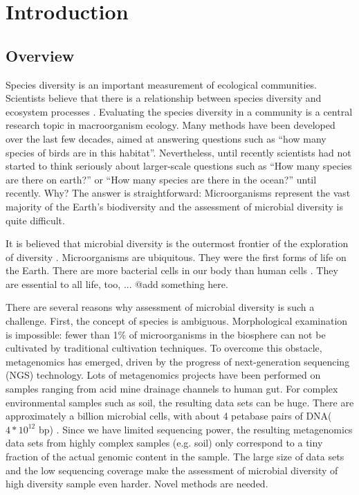 \chapter{Introduction}

\section{Overview} Species diversity is an important measurement of ecological
communities. Scientists believe that there is a relationship between species
diversity and ecosystem processes \cite{Loreau:2001aa}. Evaluating the species
diversity in a community is a central research topic in macroorganism ecology.
Many methods have been developed over the last few decades, aimed at answering
questions such as ``how many species of birds are in this habitat''.
Nevertheless, until recently scientists had not started to think seriously
about larger-scale questions such as ``How many species are there on earth?''
\cite{May:1988aa} or ``How many species are there in the ocean?''
\cite{Mora:2011aa} until recently. Why? The answer is straightforward:
Microorganisms represent the vast majority of the Earth's biodiversity and the
assessment of microbial diversity is quite difficult.

It is believed that microbial diversity is the outermost frontier of the
exploration of diversity \cite{magurran2011biological}. Microorganisms are
ubiquitous. They were the first forms of life on the Earth. There are more
bacterial cells in our body than human cells \cite{Savage:1977aa}. They are
essential to all life, too, ... @add something here.

There are several reasons why assessment of microbial diversity is such a
challenge. First, the concept of species is ambiguous. Morphological
examination is impossible: fewer than 1\% of microorganisms  in the biosphere
can not be cultivated by traditional cultivation
techniques\cite{Curtis:2002aa}. To overcome this obstacle, metagenomics has
emerged, driven by the progress of next-generation sequencing (NGS) technology.
Lots of metagenomics projects have been performed on samples ranging from acid
mine drainage channels to human gut. For complex environmental samples such as
soil, the resulting data sets can be huge. There are approximately a billion
microbial cells, with about 4 petabase pairs of DNA($4*{10}^{12}$ bp)
\cite{Zarraonaindia:2013aa}. Since we have limited sequencing power, the
resulting metagenomics data sets from highly complex samples (e.g. soil) only
correspond to a tiny fraction of the actual genomic content in the sample. The
large size of data sets and the low sequencing coverage make the assessment of
microbial diversity of high diversity sample even harder. Novel methods are
needed.


